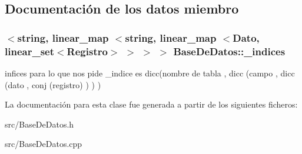 \subsection{Documentación de los datos miembro}
\hypertarget{classBaseDeDatos_ac86d59c462ea3bef3aca9fc19d26bda1}{
\subsubsection[{\-\_\-indices}]{$<$string, {\bf linear\-\_\-map} $<$string, {\bf linear\-\_\-map} $<${\bf Dato}, {\bf linear\-\_\-set}$<${\bf Registro}$>$ $>$ $>$ $>$ Base\-De\-Datos\-::\-\_\-indices\hspace{0.3cm}{\ttfamily [private]}}}\label{classBaseDeDatos_ac86d59c462ea3bef3aca9fc19d26bda1}
infices para lo que nos pide \-\_\-indice es dicc(nombre de tabla , dicc (campo , dicc (dato , conj (registro) ) ) ) 

La documentación para esta clase fue generada a partir de los siguientes ficheros\-:\begin{DoxyCompactItemize}
\item 
src/Base\-De\-Datos.\-h\item 
src/Base\-De\-Datos.\-cpp\end{DoxyCompactItemize}
